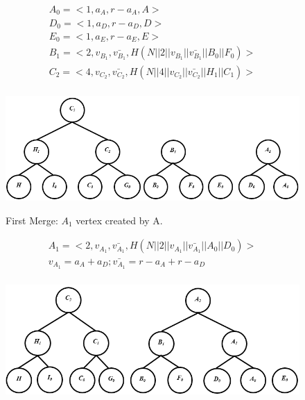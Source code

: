 \begin{exmp}
				\begin{equation}
					\begin{array}{l}
						A_{0} = <1, a_{A}, r - a_{A}, A>\\
						D_{0} = <1, a_{D}, r - a_{D}, D>\\
						E_{0} = <1, a_{E}, r - a_{E}, E>\\
						B_{1} = <2, v_{B_{1}}, \bar{v_{B_{1}}}, H(N || 2 || v_{B_{1}}|| \bar{v_{B_{1}}} || B_{0} || F_{0})>\\
						C_{2} = <4, v_{C_{2}}, \bar{v_{C_{2}}}, H(N || 4 || v_{C_{2}}|| \bar{v_{C_{2}}} || H_{1} || C_{1})>\\
					\end{array}
				\end{equation}
				\begin{figure}[h!]
					\centering
					\includegraphics[width=6in]{images/commitment-tree-example-2-shia.png}\\
					\caption{First Merge: $A_{1}$ vertex created by A.}
					\label{fig:commitment-tree-example-2-shia}
				\end{figure}
				\begin{equation}
					\begin{array}{l}
						A_{1} = <2, v_{A_{1}}, \bar{v_{A_{1}}}, H(N || 2 || v_{A_{1}}|| \bar{v_{A_{1}}} || A_{0} || D_{0})>\\
						v_{A_{1}} = a_{A} + a_{D}; \bar{v_{A_{1}}} = r - a_{A} + r - a_{D}\\
					\end{array}
				\end{equation}
				\begin{figure}[h!]
					\centering
					\includegraphics[width=6in]{images/commitment-tree-example-3-shia.png}\\

\end{figure}
\end{exmp}
